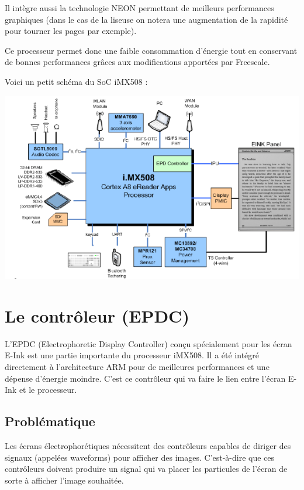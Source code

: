Il intègre aussi la technologie NEON permettant de meilleurs performances graphiques (dans le cas de la liseuse on notera une augmentation de la rapidité pour tourner les pages par exemple).

Ce processeur permet donc une faible consommation d’énergie tout en conservant de bonnes performances grâces aux modifications apportées par Freescale.


Voici un petit schéma du SoC iMX508 :

\begin{center}
	\includegraphics{iMX508.png}
\end{center}


\section{Le contrôleur (EPDC)}

L'EPDC (Electrophoretic Display Controller) conçu spécialement pour les écran E-Ink est une partie importante du processeur iMX508. Il a été intégré directement à l'architecture ARM pour de meilleures performances et une dépense d'énergie moindre. C'est ce contrôleur qui va faire le lien entre l'écran E-Ink et le processeur.

\subsection{Problématique}

Les écrans électrophorétiques nécessitent des contrôleurs capables de diriger des signaux (appelées waveforms) pour afficher des images. C'est-à-dire que ces contrôleurs doivent produire un signal qui va placer les particules de l'écran de sorte à afficher l'image souhaitée.

